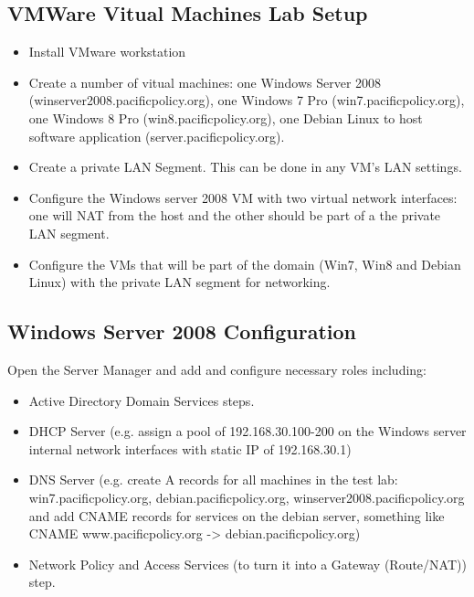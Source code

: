 \documentclass[letterpaper,10pt,english]{sphinxmanual}
\begin{document}
\subsection{VMWare Vitual Machines Lab Setup}
\label{administrator-guide:vmware-vitual-machines-lab-setup}\begin{itemize}
\item {} 
Install VMware workstation

\item {} 
Create a number of vitual machines: one Windows Server 2008
(winserver2008.pacificpolicy.org), one Windows 7 Pro
(win7.pacificpolicy.org), one Windows 8 Pro
(win8.pacificpolicy.org), one Debian Linux to host software
application (server.pacificpolicy.org).

\item {} 
Create a private LAN Segment. This can be done in any VM's LAN
settings.

\item {} 
Configure the Windows server 2008 VM with two virtual network
interfaces: one will NAT from the host and the other should be part
of a the private LAN segment.

\item {} 
Configure the VMs that will be part of the domain (Win7, Win8 and
Debian Linux) with the private LAN segment for networking.

\end{itemize}


\subsection{Windows Server 2008 Configuration}
\label{administrator-guide:windows-server-2008-configuration}
Open the Server Manager and add and configure necessary roles including:
\begin{itemize}
\item {} 
Active Directory Domain Services steps.

\item {} 
DHCP Server (e.g. assign a pool of 192.168.30.100-200 on the Windows
server internal network interfaces with static IP of 192.168.30.1)

\item {} 
DNS Server (e.g. create A records for all machines in the test lab:
win7.pacificpolicy.org, debian.pacificpolicy.org,
winserver2008.pacificpolicy.org and add CNAME records for services
on the debian server, something like CNAME www.pacificpolicy.org -\textgreater{}
debian.pacificpolicy.org)

\item {} 
Network Policy and Access Services (to turn it into a Gateway
(Route/NAT)) step.

\end{itemize}
\end{document}

